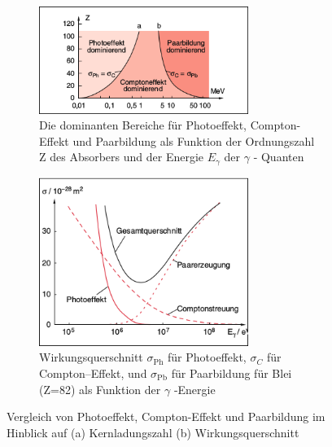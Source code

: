 \documentclass[Ex4_Zusammenfassung.tex]{subfiles}
\begin{document}
\begin{figure}[h]
		\begin{subfigure}{\textwidth}
			\centering
			\includegraphics[width=6.8cm]{FCP_Z.png}
			\caption{Die dominanten Bereiche für Photoeffekt, Compton-Effekt und Paarbildung als Funktion der Ordnungszahl Z des Absorbers und der Energie $ E_{\gamma} $ der $ \gamma $ - Quanten}
		\end{subfigure}
		\begin{subfigure}{\textwidth}
			\centering
			\includegraphics[width=6.8cm]{FCP_sigma.png}
			\caption{Wirkungsquerschnitt $ \sigma_{\text{Ph}} $ für Photoeffekt, $ \sigma_{C} $ für Compton--Effekt, und $ \sigma_{\text{Pb}} $ für Paarbildung für Blei (Z=82) als Funktion der $ \gamma $ -Energie}
		\end{subfigure}
			\caption{Vergleich von Photoeffekt, Compton-Effekt und Paarbildung im Hinblick auf (a) Kernladungszahl (b) Wirkungsquerschnitt}
\end{figure}
\end{document}
